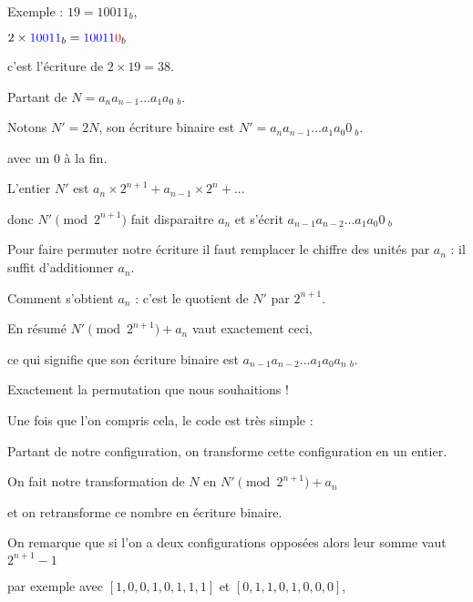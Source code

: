 \change 

Exemple : $19 = 10011_b$,

$2 \times{\color{blue}10011}_b  = {\color{blue}10011}{\color{red}0}_b$

c'est l'écriture de $2 \times 19 = 38$.

\change

 Partant de $N=a_n  a_{n-1}\ldots a_1 a_0 \ _b$. 
  
\change

Notons $N'=2N$, son écriture binaire est 
$N' = a_n  a_{n-1}\ldots a_1 a_0 0 \ _b$.

avec un $0$ à la fin.

\change

L'entier $N'$ est $a_n \times 2^{n+1} + a_{n-1} \times 2^n + ...$

donc $N' \pmod {2^{n+1}}$ fait disparaitre $a_n$ et s'écrit 
$a_{n-1} a_{n-2} \ldots a_1 a_0 0 \ _b$ 
  
\change

Pour faire permuter notre écriture il faut remplacer le chiffre des unités  par $a_n$ :
il suffit d'additionner $a_n$.

Comment s'obtient $a_n$ : c'est le quotient de $N'$ par $2^{n+1}$.

\change

En résumé $N' \pmod{2^{n+1}} + a_n$ vaut exactement ceci,

\change


ce qui signifie que son écriture binaire est $a_{n-1} a_{n-2} \ldots a_1 a_0 a_n \ _b$.

Exactement la permutation que nous souhaitions !


\change

Une fois que l'on compris cela, le code est très simple :

Partant de notre configuration, on transforme cette configuration en un entier.

On fait notre transformation de $N$ en $N' \pmod{2^{n+1}} + a_n$

et on retransforme ce nombre en écriture binaire.


\diapo

On remarque que si l'on a deux configurations opposées alors leur somme vaut $2^{n+1}-1$

\change

par exemple avec $[1,0,0,1,0,1,1,1]$ et $[0,1,1,0,1,0,0,0]$,

\change

